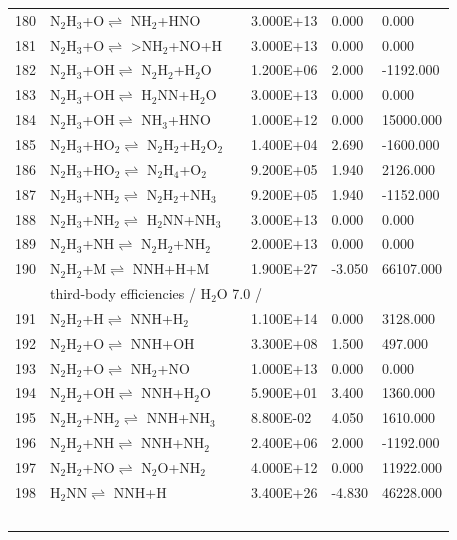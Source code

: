 \documentclass[11pt]{article}
\begin{document}
\begin{table}[hbt]
\begin{tabular}{|r l c l l l|}
180 &	N$_{2}$H$_{3}$+O$\rightleftharpoons$ NH$_{2}$+HNO&	&	3.000E+13&	0.000&	0.000\\ 
181 &	N$_{2}$H$_{3}$+O$\rightleftharpoons$ >NH$_{2}$+NO+H&	&	3.000E+13&	0.000&	0.000\\ 
182 &	N$_{2}$H$_{3}$+OH$\rightleftharpoons$ N$_{2}$H$_{2}$+H$_{2}$O&	&	1.200E+06&	2.000&	-1192.000\\ 
183 &	N$_{2}$H$_{3}$+OH$\rightleftharpoons$ H$_{2}$NN+H$_{2}$O&	&	3.000E+13&	0.000&	0.000\\ 
184 &	N$_{2}$H$_{3}$+OH$\rightleftharpoons$ NH$_{3}$+HNO&	&	1.000E+12&	0.000&	15000.000\\ 
185 &	N$_{2}$H$_{3}$+HO$_{2}$$\rightleftharpoons$ N$_{2}$H$_{2}$+H$_{2}$O$_{2}$&	&	1.400E+04&	2.690&	-1600.000\\ 
186 &	N$_{2}$H$_{3}$+HO$_{2}$$\rightleftharpoons$ N$_{2}$H$_{4}$+O$_{2}$&	&	9.200E+05&	1.940&	2126.000\\ 
187 &	N$_{2}$H$_{3}$+NH$_{2}$$\rightleftharpoons$ N$_{2}$H$_{2}$+NH$_{3}$&	&	9.200E+05&	1.940&	-1152.000\\ 
188 &	N$_{2}$H$_{3}$+NH$_{2}$$\rightleftharpoons$ H$_{2}$NN+NH$_{3}$&	&	3.000E+13&	0.000&	0.000\\ 
189 &	N$_{2}$H$_{3}$+NH$\rightleftharpoons$ N$_{2}$H$_{2}$+NH$_{2}$&	&	2.000E+13&	0.000&	0.000\\ 
190 &	N$_{2}$H$_{2}$+M$\rightleftharpoons$ NNH+H+M&	&	1.900E+27&	-3.050&	66107.000\\ 
	&\multicolumn{5}{l|}{third-body efficiencies  / H$_{2}$O 7.0 /}\\ 
191 &	N$_{2}$H$_{2}$+H$\rightleftharpoons$ NNH+H$_{2}$&	&	1.100E+14&	0.000&	3128.000\\ 
192 &	N$_{2}$H$_{2}$+O$\rightleftharpoons$ NNH+OH&	&	3.300E+08&	1.500&	497.000\\ 
193 &	N$_{2}$H$_{2}$+O$\rightleftharpoons$ NH$_{2}$+NO&	&	1.000E+13&	0.000&	0.000\\ 
194 &	N$_{2}$H$_{2}$+OH$\rightleftharpoons$ NNH+H$_{2}$O&	&	5.900E+01&	3.400&	1360.000\\ 
195 &	N$_{2}$H$_{2}$+NH$_{2}$$\rightleftharpoons$ NNH+NH$_{3}$&	&	8.800E-02&	4.050&	1610.000\\ 
196 &	N$_{2}$H$_{2}$+NH$\rightleftharpoons$ NNH+NH$_{2}$&	&	2.400E+06&	2.000&	-1192.000\\ 
197 &	N$_{2}$H$_{2}$+NO$\rightleftharpoons$ N$_{2}$O+NH$_{2}$&	&	4.000E+12&	0.000&	11922.000\\ 
198 &	H$_{2}$NN$\rightleftharpoons$ NNH+H&	&	3.400E+26&	-4.830&	46228.000\\ 
$$
\end{tabular}
\end{table}
\end{document}

